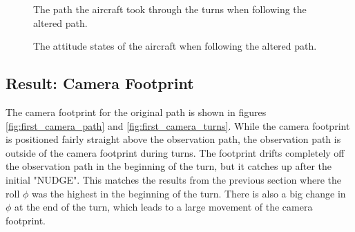 \begin{figure}[]
    \centering
    \caption{The path the aircraft took through the turns when following the altered path.}
	\label{fig:second_run_turns}
\end{figure}

\begin{figure}[]
    \centering
    \caption{The attitude states of the aircraft when following the altered path.}
	\label{fig:second_run_states}
\end{figure}


\subsection{Result: Camera Footprint}

The camera footprint for the original path is shown in figures \ref{fig:first_camera_path} and \ref{fig:first_camera_turns}. While the camera footprint is positioned fairly straight above the observation path, the observation path is outside of the camera footprint during turns. The footprint drifts completely off the observation path in the beginning of the turn, but it catches up after the initial "NUDGE". This matches the results from the previous section where the roll $\phi$ was the highest in the beginning of the turn. There is also a big change in $\phi$ at the end of the turn, which leads to a large movement of the camera footprint.

